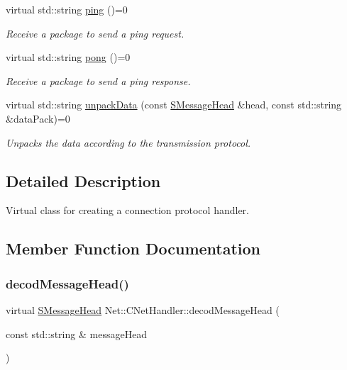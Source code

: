 \begin{DoxyCompactItemize}
virtual std\+::string \mbox{\hyperlink{class_net_1_1_c_net_handler_af905edf8c2f5dee54f278f78d66b400d}{ping}} ()=0
\begin{DoxyCompactList}\small\item\em Receive a package to send a ping request. \end{DoxyCompactList}\item 
virtual std\+::string \mbox{\hyperlink{class_net_1_1_c_net_handler_a818189d3332d68cf28d30ec31bed0e17}{pong}} ()=0
\begin{DoxyCompactList}\small\item\em Receive a package to send a ping response. \end{DoxyCompactList}\item 
virtual std\+::string \mbox{\hyperlink{class_net_1_1_c_net_handler_aea2d09ea3bfa8d7a13ace3aec6ba9356}{unpack\+Data}} (const \mbox{\hyperlink{struct_net_1_1_s_message_head}{S\+Message\+Head}} \&head, const std\+::string \&data\+Pack)=0
\begin{DoxyCompactList}\small\item\em Unpacks the data according to the transmission protocol. \end{DoxyCompactList}\end{DoxyCompactItemize}


\subsection{Detailed Description}
Virtual class for creating a connection protocol handler. 

\subsection{Member Function Documentation}
\mbox{\label{class_net_1_1_c_net_handler_a992b6c07fcda7c7f8ee411773b7dc3c6}} 
\subsubsection{\texorpdfstring{decod\+Message\+Head()}{decodMessageHead()}}
{\footnotesize\ttfamily virtual \mbox{\hyperlink{struct_net_1_1_s_message_head}{S\+Message\+Head}} Net\+::\+C\+Net\+Handler\+::decod\+Message\+Head (\begin{DoxyParamCaption}\item[{const std\+::string \&}]{message\+Head }\end{DoxyParamCaption})\hspace{0.3cm}{\ttfamily [pure virtual]}}



